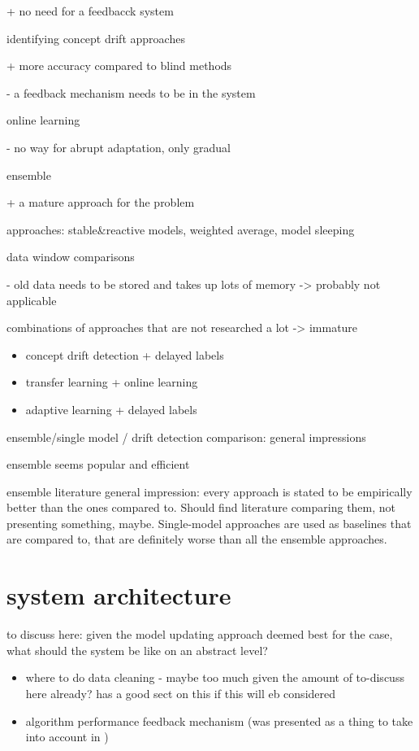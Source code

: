 + no need for a feedbacck system

identifying concept drift approaches

+ more accuracy compared to blind methods \cite{conceptdriftsurvey}

- a feedback mechanism needs to be in the system

online learning

- no way for abrupt adaptation, only gradual \cite{conceptdriftsurvey}

ensemble

+ a mature approach for the problem \cite{mlforstreamingsurvey}

approaches: stable&reactive models, weighted average, model sleeping \cite{conceptdriftsurvey}

data window comparisons

- old data needs to be stored and takes up lots of memory \cite{conceptdriftsurvey} -> probably not applicable

combinations of approaches that are not researched a lot -> immature

\begin{itemize}
    \item concept drift detection + delayed labels \cite{mlforstreamingsurvey}
    \item transfer learning + online learning \cite{mlforstreamingsurvey}
    \item adaptive learning + delayed labels \cite{mlforstreamingsurvey}
\end{itemize}

ensemble/single model / drift detection comparison: general impressions

ensemble seems popular and efficient

ensemble literature general impression: every approach is stated to be empirically better than the ones compared to. Should find literature comparing them, not presenting something, maybe. Single-model approaches are used as baselines that are compared to, that are definitely worse than all the ensemble approaches.

\section{system architecture}

to discuss here: given the model updating approach deemed best for the case, what should the system be like on an abstract level?

\begin{itemize}
    \item where to do data cleaning - maybe too much given the amount of to-discuss here already? \cite{mlforstreamingsurvey} has a good sect on this if this will eb considered
    \item algorithm performance feedback mechanism (was presented as a thing to take into account in \cite{streamminingchallenges})
\end{itemize}

